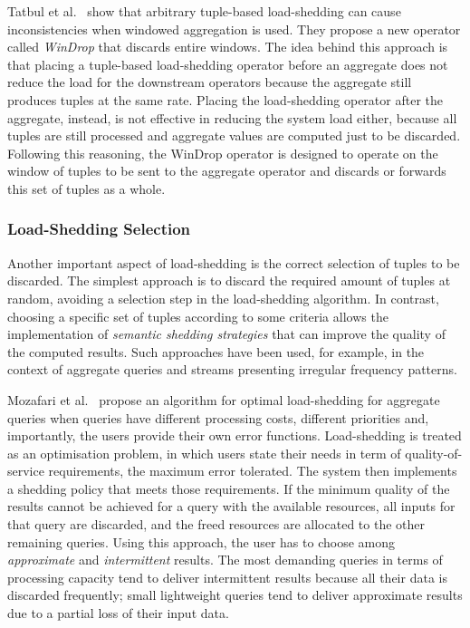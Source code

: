 Tatbul et al.~\cite{loadshed-tatbul2} show that arbitrary tuple-based load-shedding can cause
inconsistencies when windowed aggregation is used. They propose a new operator called \emph{WinDrop}
that discards entire windows. The idea behind this approach is that
placing a tuple-based \mbox{load-shedding} operator before an aggregate does not reduce the load for the
downstream operators because the aggregate still produces tuples at the same rate. Placing the \mbox{load-shedding}
operator after the aggregate, instead, is not effective in reducing the system load either, because all
tuples are still processed and aggregate values are computed just to be discarded. Following this
reasoning, the WinDrop operator is designed to operate on the window of tuples to be sent to the
aggregate operator and discards or forwards this set of tuples as a whole.
\subsubsection*{\mbox{Load-Shedding} Selection}
Another important aspect of load-shedding is the correct selection of tuples to be discarded. The
simplest approach is to discard the required amount of tuples at random, avoiding a selection step in
the load-shedding algorithm. In contrast, choosing a specific set of tuples according to some
criteria allows the implementation of \emph{semantic shedding strategies} that can improve the quality of
the computed results. Such approaches have been used, for example, in the context of aggregate
queries and streams presenting irregular frequency patterns.
	
Mozafari et al.~\cite{loadshed-mozafari} propose an algorithm for optimal \mbox{load-shedding} for
aggregate queries when queries have different processing costs, different priorities and, importantly,
the users provide their own error functions. \mbox{Load-shedding} is treated as an optimisation problem,
in which users state their needs in term of quality-of-service requirements, \eg the maximum error
tolerated. The system then implements a shedding policy that meets those requirements. If the minimum
quality of the results cannot be achieved for a query with the available resources, all inputs for that
query are discarded, and the freed resources are allocated to the other remaining queries. Using this
approach, the user has to choose among \emph{approximate} and \emph{intermittent} results. The most
demanding queries in terms of processing capacity tend to deliver intermittent results because all their
data is discarded frequently; small lightweight queries tend to deliver approximate results due to
a partial loss of their input data.

